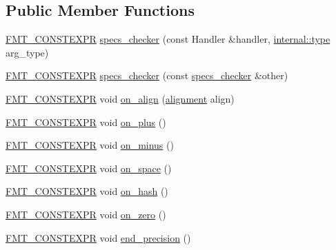 \subsection*{Public Member Functions}
\begin{DoxyCompactItemize}
\item 
\hyperlink{core_8h_a69201cb276383873487bf68b4ef8b4cd}{F\+M\+T\+\_\+\+C\+O\+N\+S\+T\+E\+X\+PR} \hyperlink{classinternal_1_1specs__checker_afe7e3d3c7f0acc86ba7febff36b44a83}{specs\+\_\+checker} (const Handler \&handler, \hyperlink{namespaceinternal_a8661864098ac0acff9a6dd7e66f59038}{internal\+::type} arg\+\_\+type)
\item 
\hyperlink{core_8h_a69201cb276383873487bf68b4ef8b4cd}{F\+M\+T\+\_\+\+C\+O\+N\+S\+T\+E\+X\+PR} \hyperlink{classinternal_1_1specs__checker_a0d84f57d4674c774d5c7ac8c45eb5bab}{specs\+\_\+checker} (const \hyperlink{classinternal_1_1specs__checker}{specs\+\_\+checker} \&other)
\item 
\hyperlink{core_8h_a69201cb276383873487bf68b4ef8b4cd}{F\+M\+T\+\_\+\+C\+O\+N\+S\+T\+E\+X\+PR} void \hyperlink{classinternal_1_1specs__checker_ab4c0aaf640c5bf31b031a6fd502213fb}{on\+\_\+align} (\hyperlink{format_8h_a5460ac1c70db05be4ec2268f463ea981}{alignment} align)
\item 
\hyperlink{core_8h_a69201cb276383873487bf68b4ef8b4cd}{F\+M\+T\+\_\+\+C\+O\+N\+S\+T\+E\+X\+PR} void \hyperlink{classinternal_1_1specs__checker_a12d7b0e358cb4fa37ea1e743fc91df62}{on\+\_\+plus} ()
\item 
\hyperlink{core_8h_a69201cb276383873487bf68b4ef8b4cd}{F\+M\+T\+\_\+\+C\+O\+N\+S\+T\+E\+X\+PR} void \hyperlink{classinternal_1_1specs__checker_ab52e2fc452636fd081d9392956dfe6e9}{on\+\_\+minus} ()
\item 
\hyperlink{core_8h_a69201cb276383873487bf68b4ef8b4cd}{F\+M\+T\+\_\+\+C\+O\+N\+S\+T\+E\+X\+PR} void \hyperlink{classinternal_1_1specs__checker_ad3ad96ca1b6ccf5495de4aecbb1a4d7a}{on\+\_\+space} ()
\item 
\hyperlink{core_8h_a69201cb276383873487bf68b4ef8b4cd}{F\+M\+T\+\_\+\+C\+O\+N\+S\+T\+E\+X\+PR} void \hyperlink{classinternal_1_1specs__checker_a90ca884ae61ca7badce5ca112cd168bb}{on\+\_\+hash} ()
\item 
\hyperlink{core_8h_a69201cb276383873487bf68b4ef8b4cd}{F\+M\+T\+\_\+\+C\+O\+N\+S\+T\+E\+X\+PR} void \hyperlink{classinternal_1_1specs__checker_a424213bfc129a687ad3dd6d6e872139f}{on\+\_\+zero} ()
\item 
\hyperlink{core_8h_a69201cb276383873487bf68b4ef8b4cd}{F\+M\+T\+\_\+\+C\+O\+N\+S\+T\+E\+X\+PR} void \hyperlink{classinternal_1_1specs__checker_a0c16ee4bc2e70bb2c3e736e195dcd870}{end\+\_\+precision} ()
\end{DoxyCompactItemize}


